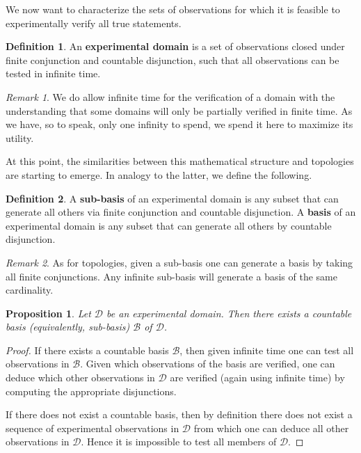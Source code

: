 \documentclass[review]{elsarticle}
\theoremstyle{plain}%
\newtheorem{prop}[thm]{Proposition}
\theoremstyle{definition}
\newtheorem{defn}{Definition}[section]
\theoremstyle{remark}
\newtheorem*{rem}{Remark}
\begin{document}
We now want to characterize the sets of observations for which it is feasible to experimentally verify all true statements.

\begin{defn}
	An \textbf{experimental domain} is a set of observations closed under finite conjunction and countable disjunction, such that all observations can be tested in infinite time. 
\end{defn}

\begin{rem}
	We do allow infinite time for the verification of a domain with the understanding that some domains will only be partially verified in finite time. As we have, so to speak, only one infinity to spend, we spend it here to maximize its utility.
\end{rem}

At this point, the similarities between this mathematical structure and topologies are starting to emerge. In analogy to the latter, we define the following.

\begin{defn}
	A \textbf{sub-basis} of an experimental domain is any subset that can generate all others via finite conjunction and countable disjunction. A \textbf{basis} of an experimental domain is any subset that can generate all others by countable disjunction.
\end{defn}

\begin{rem}
	As for topologies, given a sub-basis one can generate a basis by taking all finite conjunctions. Any infinite sub-basis will generate a basis of the same cardinality.
\end{rem}

\begin{prop}
Let $\mathcal{D}$ be an experimental domain. Then there exists a countable basis (equivalently, sub-basis) $\mathcal{B}$ of $\mathcal{D}$.
\end{prop}

\begin{proof}
If there exists a countable basis $\mathcal{B}$, then given infinite time one can test all observations in $\mathcal{B}$. Given which observations of the basis are verified, one can deduce which other observations in $\mathcal{D}$ are verified (again using infinite time) by computing the appropriate disjunctions. 

If there does not exist a countable basis, then by definition there does not exist a sequence of experimental observations in $\mathcal{D}$ from which one can deduce all other observations in $\mathcal{D}$. Hence it is impossible to test all members of $\mathcal{D}$.
\end{proof}
\end{document}
